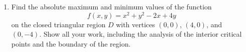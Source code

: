 \documentclass[a4paper, 12pt]{article}
\renewcommand{\headrulewidth}{0pt}
\begin{document}
\begin{enumerate}[leftmargin=*,label=\textbf{\arabic*.}]
\begin{enumerate}[label=\textbf{\alph*.}]
\item Evaluate the following limit or show that it does not exist.
\[\lim_{(x,y)\to(0,0)} \frac{x^3 y^2}{x^6 + y^4}\]
\end{enumerate}

\item Find the absolute maximum and minimum values of the function
\[f(x,y) = x^2 + y^2 - 2x + 4y\]
on the closed triangular region $D$ with vertices $(0,0)$, $(4,0)$, and $(0,-4)$. Show all your work, including the analysis of the interior critical points and the boundary of the region.
\end{enumerate}

\newpage
\pagestyle{fancy}
\renewcommand{\headrulewidth}{1pt}

\end{document}
